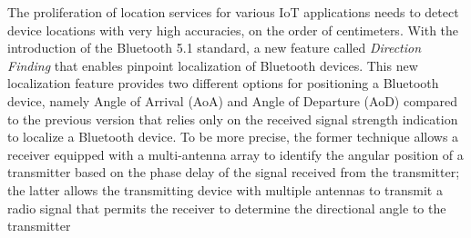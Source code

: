 The proliferation of location services for various IoT applications needs to detect device locations with very high accuracies, on the order of
centimeters. With the introduction of the Bluetooth 5.1 standard, a new feature called \textit{Direction Finding} that enables pinpoint localization
of Bluetooth devices.
This new localization feature provides two different options for positioning a Bluetooth device, namely Angle of Arrival (AoA) and Angle of Departure
(AoD) compared to the previous version that relies only on the received signal strength indication to localize a Bluetooth device.
To be more precise, the former technique allows a receiver equipped with a multi-antenna array to identify the angular position of a transmitter
based on the phase delay of the signal received from the transmitter; the latter allows the transmitting device with multiple antennas to transmit a
radio signal that permits the receiver to determine the directional angle to the transmitter
